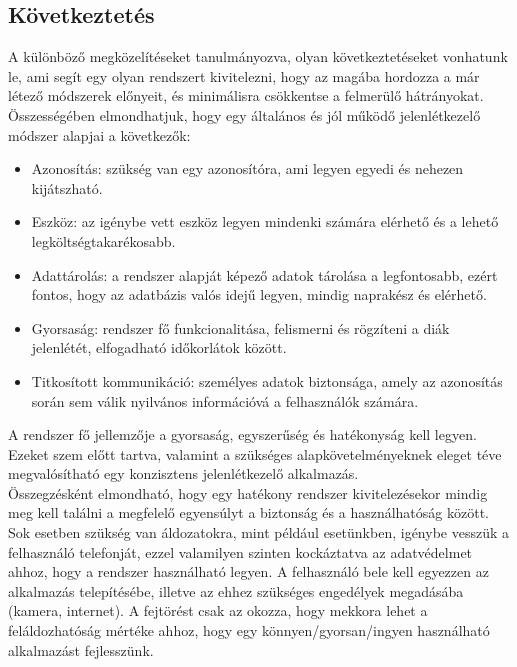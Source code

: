 \documentclass[12pt]{article}
\numberwithin{figure}{section}
\numberwithin{equation}{section}
\begin{document}
\subsection{Következtetés}
A különböző megközelítéseket tanulmányozva, olyan következtetéseket vonhatunk le, ami segít egy olyan rendszert kivitelezni, hogy az magába hordozza a már létező módszerek előnyeit, és minimálisra csökkentse a felmerülő hátrányokat.\\
Összességében elmondhatjuk, hogy egy általános és jól működő jelenlétkezelő módszer alapjai a következők:
\begin{itemize}
	\item {Azonosítás: szükség van egy azonosítóra, ami legyen egyedi és nehezen kijátszható.}
	\item {Eszköz: az igénybe vett eszköz legyen mindenki számára elérhető és a lehető legköltségtakarékosabb.}
	\item {Adattárolás: a rendszer alapját képező adatok tárolása a legfontosabb, ezért fontos, hogy az adatbázis valós idejű legyen, mindig naprakész és elérhető.}
	\item {Gyorsaság:  rendszer fő funkcionalitása, felismerni és rögzíteni a diák jelenlétét, elfogadható időkorlátok között.}
	\item {Titkosított kommunikáció: személyes adatok biztonsága, amely az azonosítás során sem válik nyilvános információvá a felhasználók számára.}
\end{itemize}
A rendszer fő jellemzője a gyorsaság, egyszerűség és hatékonyság kell legyen. Ezeket szem előtt tartva, valamint a szükséges alapkövetelményeknek eleget téve megvalósítható egy konzisztens jelenlétkezelő alkalmazás.\\
Összegzésként elmondható, hogy egy hatékony rendszer kivitelezésekor mindig meg kell találni a megfelelő egyensúlyt a biztonság és a használhatóság között. Sok esetben szükség van áldozatokra, mint például esetünkben, igénybe vesszük a felhasználó telefonját, ezzel valamilyen szinten kockáztatva az adatvédelmet ahhoz, hogy a rendszer használható legyen.  A felhasználó bele kell egyezzen az alkalmazás telepítésébe, illetve az ehhez szükséges engedélyek megadásába (kamera, internet). A fejtörést csak az okozza, hogy mekkora lehet a feláldozhatóság mértéke ahhoz, hogy egy könnyen/gyorsan/ingyen használható alkalmazást fejlesszünk.\\
\end{document}
